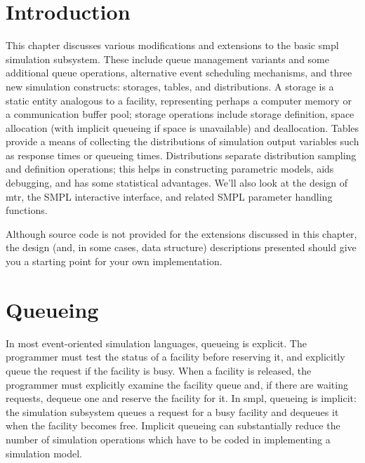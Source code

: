 \thispagestyle{empty}
\setcounter{chapter}{9}
\setcounter{section}{0}
\vspace*{0.8in}
\vspace{0.25in}
\label{chap:extending-smpl}

\section{Introduction}

This chapter discusses various modifications and extensions to the basic
smpl simulation subsystem. These include queue management variants and
some additional queue operations, alternative event scheduling mechanisms,
and three new simulation constructs: storages, tables, and distributions. A
storage is a static entity analogous to a facility, representing perhaps a
computer memory or a communication buffer pool; storage operations include
storage definition, space allocation (with implicit queueing if space is
unavailable) and deallocation. Tables provide a means of collecting the
distributions of simulation output variables such as response times or
queueing times. Distributions separate distribution sampling and definition
operations; this helps in constructing parametric models, aids debugging,
and has some statistical advantages. We'll also look at the design of mtr,
the SMPL interactive interface, and related SMPL parameter handling
functions.

Although source code is not provided for the extensions discussed in this
chapter, the design (and, in some cases, data structure) descriptions
presented should give you a starting point for your own implementation.

\section{Queueing}

In most event-oriented simulation languages, queueing is explicit. The
programmer must test the status of a facility before reserving it, and
explicitly queue the request if the facility is busy. When a facility is released,
the programmer must explicitly examine the facility queue and, if there
are waiting requests, dequeue one and reserve the facility for it. In smpl,
queueing is implicit: the simulation subsystem queues a request for a busy
facility and dequeues it when the facility becomes free. Implicit queueing
\noindent can substantially reduce the number of simulation operations which have to
be coded in implementing a simulation model.

